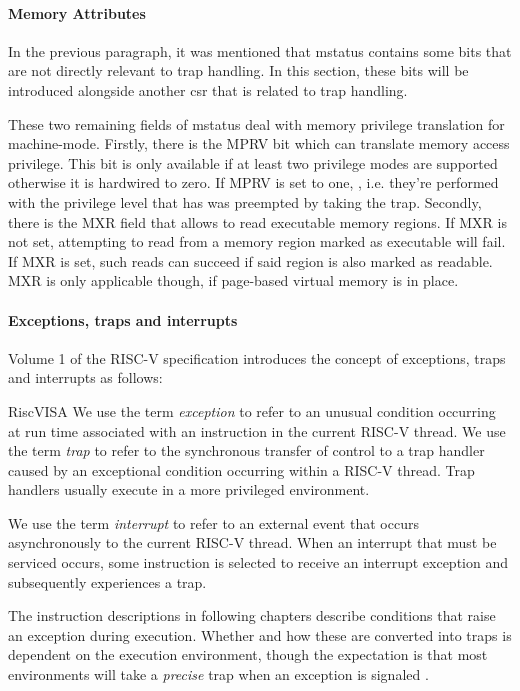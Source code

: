 \paragraph{Memory Attributes}
\label{sec:memory-attrs}

In the previous paragraph, it was mentioned that \gls{mstatus} contains some bits that are not directly relevant to trap handling.
In this section, these bits will be introduced alongside another \gls{csr} that is related to trap handling.

These two remaining fields of \gls{mstatus} deal with memory privilege translation for machine-mode.
Firstly, there is the MPRV bit which can translate memory access privilege.
This bit is only available if at least two privilege modes are supported otherwise it is hardwired to zero.
If MPRV is set to one, , i.e. they're performed with the privilege level that has was preempted by taking the trap.
Secondly, there is the MXR field that allows to read executable memory regions.
If MXR is not set, attempting to read from a memory region marked as executable will fail.
If MXR is set, such reads can succeed if said region is also marked as readable.
MXR is only applicable though, if page-based virtual memory is in place.


\paragraph{Exceptions, traps and interrupts}

Volume 1 of the RISC-V specification \cite{RiscVISA} introduces the concept of exceptions, traps and interrupts as follows:
\begin{displaycquote}{RiscVISA}
    We use the term \textit{exception} to refer to an unusual condition occurring at run time associated with an instruction in the current RISC-V thread.
    We use the term \textit{trap} to refer to the synchronous transfer of control to a trap handler caused by an exceptional condition occurring within a RISC-V thread.
    Trap handlers usually execute in a more privileged environment.

    We use the term \textit{interrupt} to refer to an external event that occurs asynchronously to the current RISC-V thread.
    When an interrupt that must be serviced occurs, some instruction is selected to receive an interrupt exception and subsequently experiences a trap.

    The instruction descriptions in following chapters describe conditions that raise an exception during execution.
    Whether and how these are converted into traps is dependent on the execution environment, though the expectation is that most environments will take a \textit{precise} trap when an exception is signaled \textelp{}.
\end{displaycquote}

